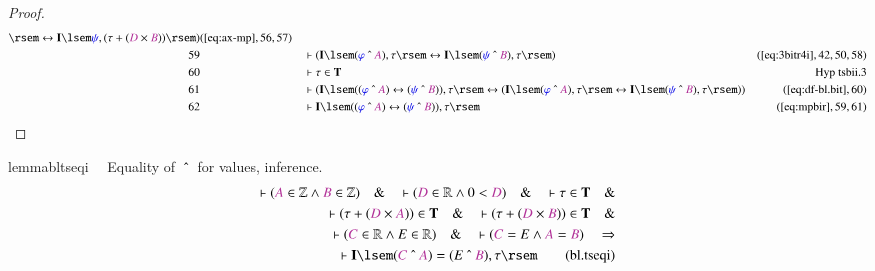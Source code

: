 \begin{proof}
\begin{align}
      \rsem \leftrightarrow \mathbf{I} \lsem \mw{\psi} , (
      \tau + ( \mc{D} \times \mc{B} ) ) \rsem
      )&(\mbox{\ref{eq:ax-mp}},56,57)\notag
  \\ 59 &&  & \vdash ( \mathbf{I} \lsem ( \mw{\varphi} ~\string^~ \mc{A} ) ,
      \tau \rsem \leftrightarrow \mathbf{I} \lsem (
      \mw{\psi} ~\string^~ \mc{B} ) , \tau \rsem
      )&(\mbox{\ref{eq:3bitr4i}},42,50,58)\notag
  \\ 60 &&  & \vdash \tau \in \mathbf{T}&\text{Hyp~tsbii.3}\notag%
  \\ 61 &&  & \vdash ( \mathbf{I} \lsem ( ( \mw{\varphi} ~\string^~ \mc{A} )
      \leftrightarrow ( \mw{\psi} ~\string^~ \mc{B} ) ) ,
      \tau \rsem \leftrightarrow ( \mathbf{I} \lsem (
      \mw{\varphi} ~\string^~ \mc{A} ) , \tau \rsem
      \leftrightarrow \mathbf{I} \lsem ( \mw{\psi}
      ~\string^~ \mc{B} ) , \tau \rsem )
      )&(\mbox{\ref{eq:df-bl.bit}},60)\notag
  \\ 62 &&  & \vdash \mathbf{I} \lsem ( ( \mw{\varphi} ~\string^~ \mc{A} )
      \leftrightarrow ( \mw{\psi} ~\string^~ \mc{B} ) ) ,
      \tau \rsem&(\mbox{\ref{eq:mpbir}},59,61)\notag
\end{align}
\end{proof}

\begin{restatable}{lemma}{bltseqi}~~ Equality of $~\string^~$ for values,
inference.
\begin{align}
\vdash ( \mc{A} \in \mathbb{Z} \wedge \mc{B} \in \mathbb{Z} )\quad\&\quad
    \vdash ( \mc{D} \in \mathbb{R} \wedge 0 < \mc{D} )\quad\&\quad \vdash \tau
    \in \mathbf{T}\quad\& \notag \\ %
     \quad \vdash ( \tau + ( \mc{D} \times \mc{A} ) ) \in
    \mathbf{T}\quad\&\quad \vdash ( \tau + ( \mc{D} \times \mc{B} ) ) \in
    \mathbf{T}\quad\& \notag \\ %
     \quad \vdash ( \mc{C} \in \mathbb{R} \wedge E \in
    \mathbb{R} )\quad\&\quad \vdash ( \mc{C} = E \wedge \mc{A} = \mc{B}
    )\quad\Rightarrow \notag \\ %
     \quad \vdash \mathbf{I} \lsem ( \mc{C} ~\string^~ \mc{A} )
    = ( E ~\string^~ \mc{B} ) , \tau \rsem\label{eq:bl.tseqi}\tag{bl.tseqi}
\end{align}
\end{restatable}

